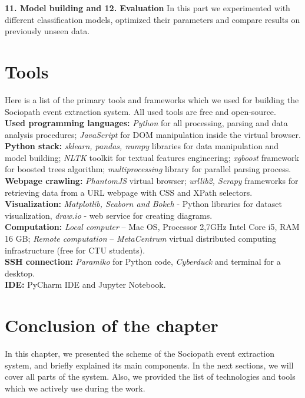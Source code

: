 \textbf{11. Model building and 12. Evaluation} In this part we experimented with different classification models, optimized their parameters and compare results on previously unseen data. \\

\section{Tools}

Here is a list of the primary tools and frameworks which we used for building the Sociopath event extraction system. All used tools are free and open-source.\\

\noindent\textbf{Used programming languages:} \textit{Python} for all processing, parsing and data analysis procedures; \textit{JavaScript} for DOM manipulation inside the virtual browser.\\

\noindent\textbf{Python stack:} \textit{sklearn, pandas, numpy} libraries for data manipulation and model building; \textit{NLTK} toolkit for textual features engineering;  \textit{xgboost} framework for boosted trees algorithm; \textit{multiprocessing} library for parallel parsing process. \\

\noindent\textbf{Webpage crawling:} \textit{PhantomJS} virtual browser; \textit{urllib2, Scrapy} frameworks for retrieving data from a URL webpage with CSS and XPath selectors.\\

\noindent\textbf{Visualization:} \textit{Matplotlib, Seaborn and Bokeh} - Python libraries for dataset visualization, \textit{draw.io} - web service for creating diagrams. \\

\noindent\textbf{Computation:} \textit{Local computer} -- Mac OS, Processor 2,7GHz Intel Core i5, RAM 16 GB; \textit{Remote computation} -- \textit{MetaCentrum} virtual distributed computing infrastructure (free for CTU students).\\

\noindent\textbf{SSH connection:} \textit{Paramiko} for Python code, \textit{Cyberduck} and terminal for a desktop.\\

\noindent\textbf{IDE:} PyCharm IDE and Jupyter Notebook.\\

\section*{Conclusion of the chapter}
In this chapter, we presented the scheme of the Sociopath event extraction system, and briefly explained its main components. In the next sections, we will cover all parts of the system. Also, we provided the list of technologies and tools which we actively use during the work. 
